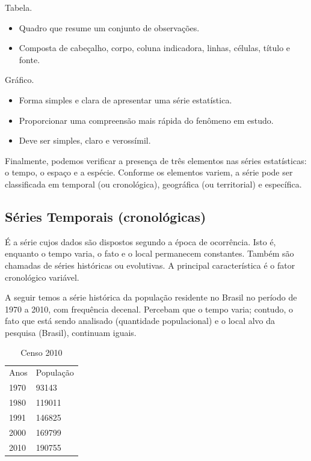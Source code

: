   Tabela.
  \begin{itemize}
    \item Quadro que resume um conjunto de observações.
    \item Composta de cabeçalho, corpo, coluna indicadora, linhas, células, título e fonte.
  \end{itemize}
  Gráfico.
  \begin{itemize}
    \item Forma simples e clara de apresentar uma série estatística.
    \item Proporcionar uma compreensão mais rápida do fenômeno em estudo.
    \item Deve ser simples, claro e verossímil.
  \end{itemize}
Finalmente, podemos verificar a presença de três elementos nas séries estatísticas: o tempo, o espaço e a espécie. Conforme os elementos variem, a série pode ser classificada em temporal (ou cronológica), geográfica (ou territorial) e específica.

\subsection{Séries Temporais (cronológicas)}

É a série cujos dados são dispostos segundo a época de ocorrência. Isto é, enquanto o tempo varia, o fato e o local permanecem constantes. Também são chamadas de séries históricas ou evolutivas. A principal característica é o fator cronológico variável.

A seguir temos a série histórica da população residente no Brasil no período de 1970 a 2010, com frequência decenal. Percebam que o tempo varia; contudo, o fato que está sendo analisado (quantidade populacional) e o local alvo da pesquisa (Brasil), continuam iguais.

\begin{table}[H]
    \centering
    \begin{tabular}{ll}
        \toprule
      Anos  &   População\\
      1970  &   93143\\
      1980  &   119011\\
      1991  &   146825\\
      2000  &   169799\\
      2010  &   190755\\
        \midrule
        \bottomrule
          \end{tabular}
    \caption{Censo 2010}
\end{table}


